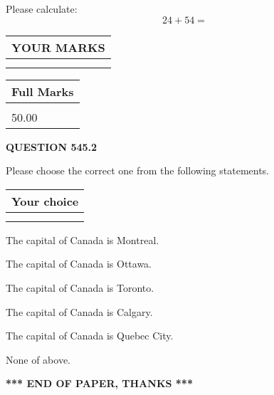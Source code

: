 \documentclass[12pt]{article}
\begin{document}
  
 
Please calculate:
\begin{equation}
24 +  %
54 = \nonumber
\end{equation}
 

 

 
  
\vspace{0.2in}
  
\noindent\begin{tabular}{|l|}
\hline
 YOUR MARKS  \\
\hline
 \\ 
 \\ 
\hline
\end{tabular}
\hspace{0.05in} \begin{tabular}{|l|}
\hline
 Full Marks  \\
\hline
 \\ 
50.00 \\
\hline
\end{tabular}
{\textbf{\Large{QUESTION
545.2 
}}}
  
  
Please choose the correct one from the following statements.
  
  
\noindent\hspace{3.0in} \begin{tabular}{|l|}
\hline
Your choice \\
\hline
 \\ 
 \\ 
\hline
\end{tabular}
  
  
 
 
The capital of Canada is Montreal.
 
 
The capital of Canada is Ottawa.
 
 
The capital of Canada is Toronto.
 
 
The capital of Canada is Calgary.
 
 
The capital of Canada is Quebec City.
 
 
 None of above.
 
 
   
   
 \vspace{0.2in}
 
   
   
   
   
\vspace{1.0in} 
{\textbf{\large{ *** END OF PAPER, THANKS *** }}} 
   
\end{document}
